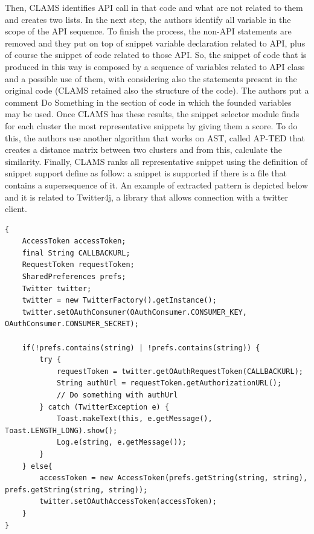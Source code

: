  Then, CLAMS identifies API call in that code and what are not related to them and creates two lists. In the next step, the authors identify all variable in the scope of the API sequence. To finish the process, the non-API statements are removed and they put on top of snippet variable declaration related to API, plus of course the snippet of code related to those API. So, the snippet of code that is produced in this way is composed by a sequence of variables related to API class and a possible use of them, with considering also the statements present in the original code (CLAMS retained also the structure of the code). The authors put a comment Do Something in the section of code in which the founded variables may be used. \newline
Once CLAMS has these results, the snippet selector module finds for each cluster the most representative snippets by giving them a score. To do this, 
the authors use another algorithm that works on AST, called AP-TED that creates a distance matrix between two clusters and from this, calculate the similarity. Finally, CLAMS ranks all representative snippet using the definition of snippet support define as follow: a snippet is supported if there is a file that contains a supersequence of it. An example of extracted pattern is depicted below and it is related to Twitter4j, a library that allows connection with a twitter client. 
\begin{lstlisting}
{
    AccessToken accessToken;
    final String CALLBACKURL;
    RequestToken requestToken;
    SharedPreferences prefs;
    Twitter twitter;
    twitter = new TwitterFactory().getInstance();
    twitter.setOAuthConsumer(OAuthConsumer.CONSUMER_KEY, OAuthConsumer.CONSUMER_SECRET);

    if(!prefs.contains(string) | !prefs.contains(string)) {
        try {
            requestToken = twitter.getOAuthRequestToken(CALLBACKURL);
            String authUrl = requestToken.getAuthorizationURL();
            // Do something with authUrl
        } catch (TwitterException e) {
            Toast.makeText(this, e.getMessage(), Toast.LENGTH_LONG).show();
            Log.e(string, e.getMessage());
        }
    } else{
        accessToken = new AccessToken(prefs.getString(string, string), prefs.getString(string, string));
        twitter.setOAuthAccessToken(accessToken);
    }
}
	
\end{lstlisting}

